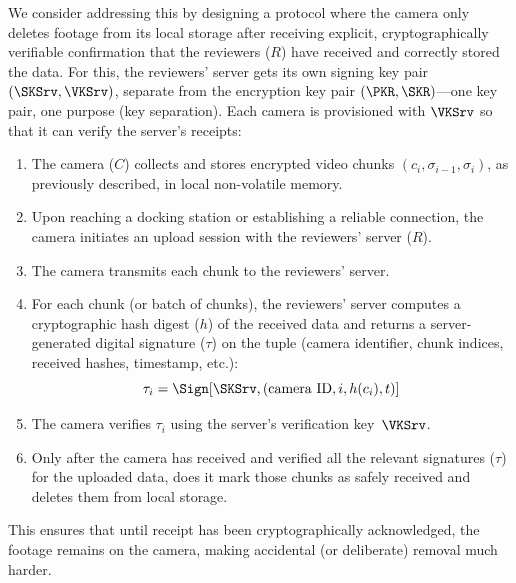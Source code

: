 We consider addressing this by designing a protocol where the camera only
deletes footage from its local storage after receiving explicit,
cryptographically verifiable confirmation that the reviewers (\(R\)) have
received and correctly stored the data.
For this, the reviewers' server gets its own signing key pair
\((\SKSrv, \VKSrv)\), separate from the encryption key pair
\((\PKR, \SKR)\)---one key pair, one purpose (key separation).
Each camera is provisioned with \(\VKSrv\) so that it can verify the
server's receipts:

\begin{enumerate}
  \item The camera (\(C\)) collects and stores encrypted video chunks
    \((c_i, \sigma_{i-1}, \sigma_i)\), as previously described, in local
    non-volatile memory.
  \item Upon reaching a docking station or establishing a reliable
    connection, the camera initiates an upload session with the reviewers'
    server (\(R\)).
  \item The camera transmits each chunk to the reviewers' server.
  \item For each chunk (or batch of chunks), the reviewers' server computes
    a cryptographic hash digest (\(h\)) of the received data and returns a
    server-generated digital signature (\(\tau\)) on the tuple (camera
    identifier, chunk indices, received hashes, timestamp, etc.):
    \[
      \tau_i = \Sign[\SKSrv, (\text{camera ID}, i, h(c_i), t)]
    \]
  \item The camera verifies \(\tau_i\) using the server's verification
    key~\(\VKSrv\).
  \item Only after the camera has received and verified all the relevant
    signatures (\(\tau\)) for the uploaded data, does it mark those chunks
    as safely received and deletes them from local storage.
\end{enumerate}

This ensures that until receipt has been cryptographically acknowledged, the
footage remains on the camera, making accidental (or deliberate) removal
much harder.

